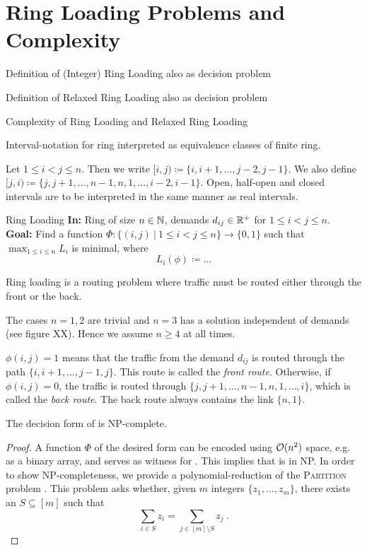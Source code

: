 \section{Ring Loading Problems and Complexity}

Definition of (Integer) Ring Loading also as decision problem

Definition of Relaxed Ring Loading also as decision problem

Complexity of Ring Loading and Relaxed Ring Loading

Interval-notation for ring interpreted as equivalence classes of finite ring.

\begin{notation}
	Let $1 \leq i < j \leq n$.
	Then we write $[i, j) \coloneqq \{i, i+1, \ldots, j-2, j-1\}$.
	We also define $[j, i) \coloneqq \{j, j+1, \ldots, n-1, n, 1, \ldots, i-2, i-1\}$.
	Open, half-open and closed intervals are to be interpreted in the same manner as real intervals.
\end{notation}

\begin{problem}{Ring Loading}
	\textbf{In:} Ring of size $n \in \mathbb{N}$, demands $d_{ij} \in \mathbb{R}^+$ for $1 \leq i < j \leq n$.\\
	\textbf{Goal:} Find a function $\Phi: \{(i, j)~|~1 \leq i < j \leq n\} \rightarrow \{0, 1\}$ such that
	$\max_{1 \leq i \leq n} L_i$ is minimal, where
	\begin{equation}
		L_i(\phi) \coloneqq \ldots
	\end{equation}
\end{problem}
Ring loading is a routing problem where traffic must be routed either through the front or the back.

The cases $n = 1, 2$ are trivial and $n = 3$ has a solution independent of demands (see figure XX). Hence we assume $n \geq 4$ at all times.

$\phi(i, j) = 1$ means that the traffic from the demand $d_{ij}$ is routed through the path $\{i, i+1, \ldots, j-1, j\}$.
This route is called the \emph{front route}.
Otherwise, if $\phi(i, j) = 0$, the traffic is routed through $\{j, j+1, \ldots, n-1, n, 1, \ldots, i\}$, which is called the \emph{back route}.
The back route always contains the link $\{n, 1\}$.

\begin{theorem}
	The decision form of \RL is NP-complete.
\end{theorem}
\begin{proof}
	A function $\Phi$ of the desired form can be encoded using $\mathcal{O}(n^2)$ space, e.g. as a binary array, and serves as witness for \RL.
	This implies that \RL is in NP.
	In order to show NP-completeness, we provide a polynomial-reduction of the \textsc{Partition} problem \cite{karp72}.
	This problem asks whether, given $m$ integers $\{z_1, \ldots, z_m\}$, there exists an $S \subseteq [m]$ such that 
	\begin{equation}
		\sum_{i \in S} z_i = \sum_{j \in [m] \setminus S} z_j \ .
	\end{equation}
	
\end{proof}

